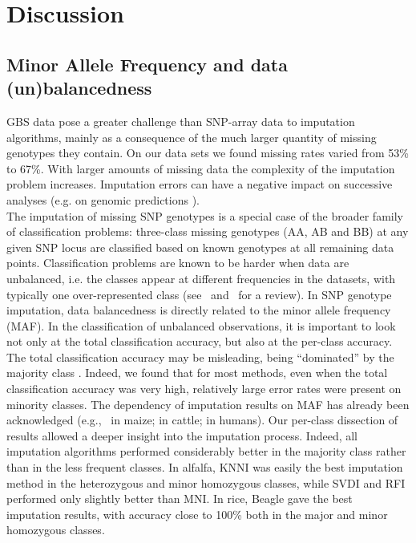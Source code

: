 \section{Discussion}
\label{sec:discussion}

\subsection{Minor Allele Frequency and data (un)balancedness}
\label{sec:maf}
GBS data pose a greater challenge than SNP-array data to imputation algorithms, mainly as a consequence of the much larger quantity of missing genotypes they contain. On our data sets we found missing rates varied from 53\% to 67\%. With larger amounts of missing data the complexity of the imputation problem increases. Imputation errors can have a negative impact on successive analyses (e.g. on genomic predictions \cite{rutkoski_imputation_2013,Annicchiarico2015}).\\
The imputation of missing SNP genotypes is a special case of the broader family of classification problems: three-class missing genotypes (AA, AB and BB) at any given SNP locus are classified based on known genotypes at all remaining data points. Classification problems are known to be harder when data are unbalanced, i.e. the classes appear at different frequencies in the datasets, with typically one over-represented class
(see~\cite{kotsiantis_handling_2006}
and~\cite{sun_classification_2009} for a review). In SNP genotype imputation, data balancedness is directly related to the minor allele frequency (MAF). In the classification of unbalanced observations, it is important to look not only at the total classification accuracy, but also at the per-class accuracy. The total classification accuracy may be misleading, being ``dominated'' by the majority class
\cite{he_learning_2009}.
Indeed, we found that for most methods, even when the total classification accuracy was very high, relatively large error rates were present on minority classes. 
The dependency of imputation results on MAF has already been acknowledged  (e.g.,~\cite{hickey_factors_2012} in maize; \cite{ma_comparison_2013} in cattle; \cite{pei_analyses_2008} in humans). Our per-class dissection of results allowed a deeper insight into the imputation process. Indeed, all imputation algorithms performed considerably better in the majority class rather than in the less frequent classes.
In alfalfa, KNNI was easily the best imputation method in the heterozygous and minor homozygous classes, while SVDI and RFI performed only slightly better than MNI. In rice, Beagle gave the best imputation results, with accuracy close to 100\% both in the major and minor homozygous classes.

